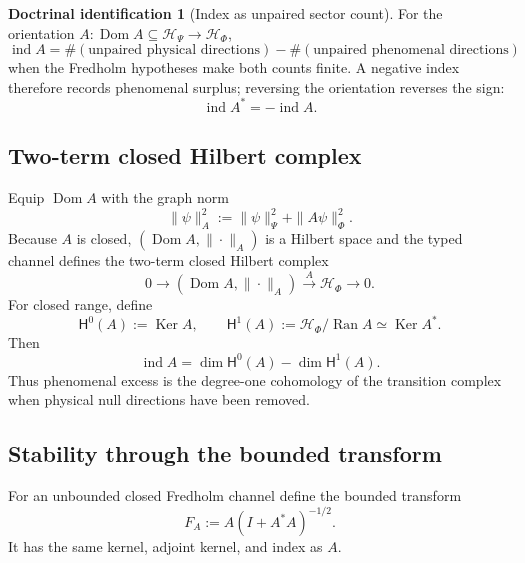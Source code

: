 \documentclass[11pt,reqno]{scrartcl}
\newcommand{\scrHP}{\mathscr H_{\Psi}}
\newcommand{\scrHF}{\mathscr H_{\Phi}}
\DeclareMathOperator{\Dom}{Dom}
\DeclareMathOperator{\Ran}{Ran}
\DeclareMathOperator{\Ker}{Ker}
\DeclareMathOperator{\ind}{ind}
\newcommand{\cohZero}{\mathsf H^{0}(A)}
\newcommand{\cohOne}{\mathsf H^{1}(A)}
\theoremstyle{plain}
\theoremstyle{definition}
\newtheorem{identification}[identification]{Doctrinal identification}
\theoremstyle{remark}
\begin{document}
\begin{identification}[Index as unpaired sector count]
\label{id:index-unpaired-count}
For the orientation $A:\Dom A\subseteq\scrHP\to\scrHF$,
\begin{equation}
  \boxed{
  \ind A
  =
  \#(\text{unpaired physical directions})
  -
  \#(\text{unpaired phenomenal directions})}
  \label{eq:index-doctrinal-reading}
\end{equation}
when the Fredholm hypotheses make both counts finite.  A negative index
therefore records phenomenal surplus; reversing the orientation reverses the
sign:
\begin{equation}
  \ind A^*=-\ind A.
  \label{eq:adjoint-index-sign}
\end{equation}
\end{identification}

\subsection{Two-term closed Hilbert complex}

Equip $\Dom A$ with the graph norm
\begin{equation}
  \|\psi\|_A^2:=\|\psi\|_{\Psi}^2+\|A\psi\|_{\Phi}^2.
\end{equation}
Because $A$ is closed, $(\Dom A,\|\cdot\|_A)$ is a Hilbert space and the
typed channel defines the two-term closed Hilbert complex
\begin{equation}
  0\longrightarrow(\Dom A,\|\cdot\|_A)
  \xrightarrow{\ A\ }
  \scrHF
  \longrightarrow0.
  \label{eq:two-term-complex}
\end{equation}
For closed range, define
\begin{equation}
  \cohZero:=\Ker A,
  \qquad
  \cohOne:=\scrHF/\Ran A\simeq\Ker A^*.
  \label{eq:transition-cohomology}
\end{equation}
Then
\begin{equation}
  \boxed{
  \ind A=\dim\cohZero-\dim\cohOne.}
  \label{eq:index-euler-characteristic}
\end{equation}
Thus phenomenal excess is the degree-one cohomology of the transition
complex when physical null directions have been removed.

\subsection{Stability through the bounded transform}

For an unbounded closed Fredholm channel define the bounded transform
\begin{equation}
  F_A:=A(I+A^*A)^{-1/2}.
  \label{eq:bounded-transform-awareness}
\end{equation}
It has the same kernel, adjoint kernel, and index as $A$.
\end{document}
